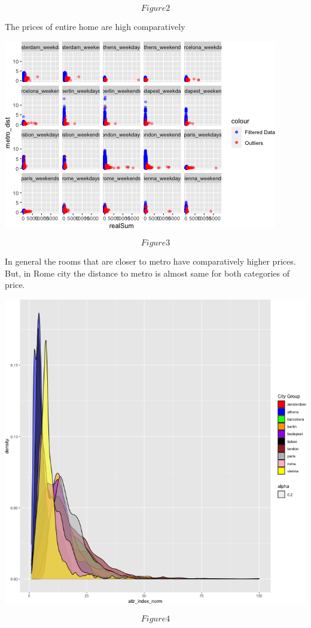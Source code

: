 \documentclass[
]{article}
\begin{document}
\[Figure 2\]

The prices of entire home are high comparatively

\includegraphics{g.png}

\[Figure 3\]

In general the rooms that are closer to metro have comparatively higher
prices. But, in Rome city the distance to metro is almost same for both
categories of price.

\includegraphics{h.png}

\[Figure 4\]
\end{document}
